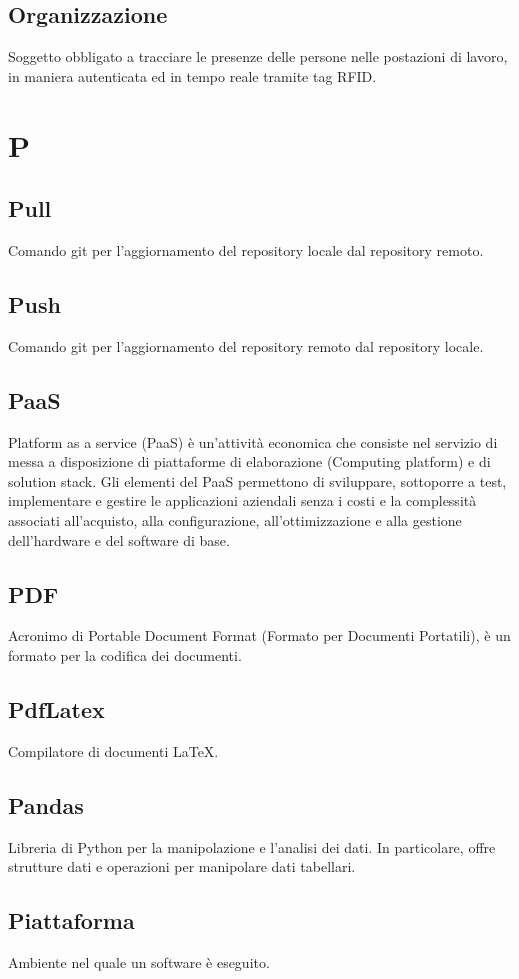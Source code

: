 \subsection{Organizzazione} Soggetto obbligato a tracciare le presenze delle persone nelle postazioni di lavoro, in maniera autenticata ed in tempo reale tramite tag RFID. 
\newpage \section{P}
\subsection{Pull} Comando git per l'aggiornamento del repository locale dal repository remoto.
\subsection{Push} Comando git per l'aggiornamento del repository remoto dal repository locale.
\subsection{PaaS} Platform as a service (PaaS) è un'attività economica che consiste nel servizio di messa a disposizione di piattaforme di elaborazione (Computing platform) e di solution stack. Gli elementi del PaaS permettono di sviluppare, sottoporre a test, implementare e gestire le applicazioni aziendali senza i costi e la complessità associati all'acquisto, alla configurazione, all'ottimizzazione e alla gestione dell'hardware e del software di base.
\subsection{PDF} Acronimo di Portable Document Format (Formato per Documenti Portatili), è un formato per la codifica dei documenti.
\subsection{PdfLatex} Compilatore di documenti \LaTeX.
\subsection{Pandas} Libreria di Python per la manipolazione e l'analisi dei dati. In particolare, offre strutture dati e operazioni per manipolare dati tabellari.
\subsection{Piattaforma} Ambiente nel quale un software è eseguito.
